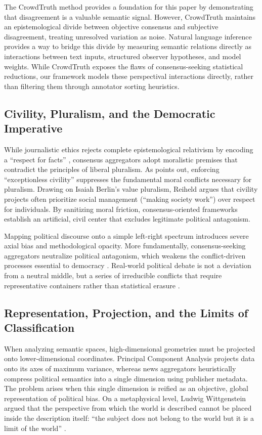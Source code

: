 The CrowdTruth method \citep{aroyo2015} provides a foundation for this paper by demonstrating that disagreement is a valuable semantic signal. However, CrowdTruth maintains an epistemological divide between objective consensus and subjective disagreement, treating unresolved variation as noise. Natural language inference provides a way to bridge this divide by measuring semantic relations directly as interactions between text inputs, structured observer hypotheses, and model weights. While CrowdTruth exposes the flaws of consensus-seeking statistical reductions, our framework models these perspectival interactions directly, rather than filtering them through annotator sorting heuristics.

\subsection{Civility, Pluralism, and the Democratic Imperative}

While journalistic ethics rejects complete epistemological relativism by encoding a ``respect for facts'' \citep{ifj2019}, consensus aggregators adopt moralistic premises that contradict the principles of liberal pluralism. As \citet{reiheld2013} points out, enforcing ``exceptionless civility'' suppresses the fundamental moral conflicts necessary for pluralism. Drawing on Isaiah Berlin's \citeyearpar{berlin1998} value pluralism, Reiheld argues that civility projects often prioritize social management (``making society work'') over respect for individuals. By sanitizing moral friction, consensus-oriented frameworks establish an artificial, civil center that excludes legitimate political antagonism.

Mapping political discourse onto a simple left-right spectrum introduces severe axial bias and methodological opacity. More fundamentally, consensus-seeking aggregators neutralize political antagonism, which weakens the conflict-driven processes essential to democracy \citep{mouffe2000}. Real-world political debate is not a deviation from a neutral middle, but a series of irreducible conflicts that require representative containers rather than statistical erasure \citep{swanstromweissmann2005}.

\subsection{Representation, Projection, and the Limits of Classification}

When analyzing semantic spaces, high-dimensional geometries must be projected onto lower-dimensional coordinates. Principal Component Analysis projects data onto its axes of maximum variance, whereas news aggregators heuristically compress political semantics into a single dimension using publisher metadata. The problem arises when this single dimension is reified as an objective, global representation of political bias. On a metaphysical level, Ludwig Wittgenstein argued that the perspective from which the world is described cannot be placed inside the description itself: ``the subject does not belong to the world but it is a limit of the world'' \citep{wittgenstein1922}.

